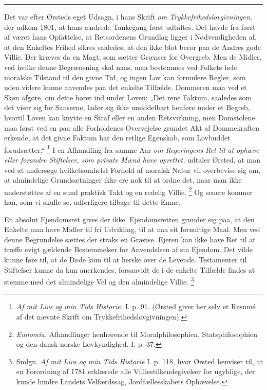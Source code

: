 \documentclass[12pt,a4paper,openany]{book}
\newcommand{\opage}[1]{\marginnote{\footnotesize\textit{[#1]}}}
\begin{document}
\begin{center}\rule{2cm}{0.4pt}\end{center}

Det var efter Ørsteds eget Udsagn, i hans Skrift \textit{om
Trykkefrihedslovgivningen,} der udkom 1801, at hans ændrede Tankegang først
udtaltes. Det havde fra først af været hans Opfattelse, at Retsordenens
Grundlag ligger i Nødvendigheden af, at den Enkeltes Frihed sikres saaledes, at
den ikke blot beror paa de Andres gode Villie. Der kræves da en Magt; som
sætter Grænser for Overgreb. Men de Midler, ved hvilke denne Begrænsning skal
naas, maa bestemmes ved Folkets hele moralske Tilstand til den givne Tid, og
ingen Lov kan formulere Regler, som uden videre kunne anvendes paa det enkelte
Tilfælde. Dommeren maa ved et Skøn afgøre, om dette hører ind under Loven: „Det
rene Faktum, saaledes som det viser sig for Sanserne, lader sig ikke
umiddelbart henføre under et Begreb, hvortil Loven kan knytte en Straf eller en
anden Retsvirkning, men Domstolene maa først ved
\setcounter{footnote}{0}%
\opage{76}en paa alle Forholdenes Overvejelse grundet Akt af Dømmekraften
erkende, at det givne Faktum har den retlige Egenskab, som Lovbuddet forudsætter.“%
\footnote[1]{\textit{Af mit Livs og min Tids Historie.} I. p. 91. (Ørsted giver
her selv et Resumé af det nævnte Skrift om Trykkefrihedslovgivningen).} I en
Afhandling fra samme Aar \textit{om Regeringens Ret til at ophæve eller
forandre Stiftelser, som private Mænd have oprettet,} udtaler Ørsted, at man
ved at undersøge hvilketsomhelst Forhold af moralsk Natur vil overbevise sig
om, at almindelige Grundsætninger ikke ere nok til at ordne det, naar man ikke
understøttes af en sund praktisk Takt og en redelig Villie.%
\footnote[2]{\textit{Eunomia.} Afhandlinger henhørende til Moralphilosophien,
Statsphilosophien og den dansk-norske Lovkyndighed. I. p. 37.} Og senere kommer
han, som vi skulle se, udførligere tilbage til dette Emne.

En absolut Ejendomsret gives der ikke. Ejendomsretten grunder sig paa, at den
Enkelte maa have Midler til fri Udvikling, til at naa sit fornuftige Maal. Men
ved denne Begrundelse sættes der straks en Grænse. Ejeren kan ikke have Ret til
at træffe evigt gældende Bestemmelser for Anvendelsen af sin Ejendom. Det vilde
kunne føre til, at de Døde kom til at herske over de Levende. Testamenter til
Stiftelser kunne da kun anerkendes, forsaavidt de i de enkelte Tilfælde findes
at stemme med det almindelige Vel og den almindelige Villie.%
\footnote[3]{Smlgn. \textit{Af mit Livs og min Tids Historie} I. p. 118, hvor
Ørsted henviser til, at en Forordning af 1781 erklærede alle
Villiestilkendegivelser for ugyldige, der kunde hindre Landets Velfærdssag,
Jordfællesskabets Ophævelse.}
\end{document}
